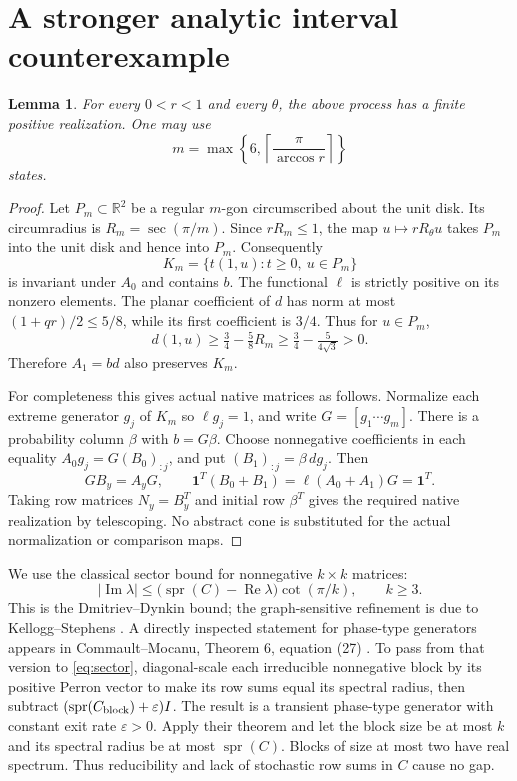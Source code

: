 \documentclass[11pt]{article}
\newtheorem{lemma}[theorem]{Lemma}
\newcommand{\R}{\mathbb R}
\newcommand{\one}{\mathbf 1}
\newcommand{\rhoo}{\operatorname{spr}}
\begin{document}
\section{A stronger analytic interval counterexample}
\begin{lemma}\label{lem:polygon}
For every $0<r<1$ and every $\theta$, the above process has a finite positive realization. One may use
\[
 m=\max\left\{6,\left\lceil\frac{\pi}{\arccos r}\right\rceil\right\}
\]
states.
\end{lemma}
\begin{proof}
Let $P_m\subset\R^2$ be a regular $m$-gon circumscribed about the unit disk. Its circumradius is $R_m=\sec(\pi/m)$. Since $rR_m\leq1$, the map $u\mapsto rR_\theta u$ takes $P_m$ into the unit disk and hence into $P_m$. Consequently
\[
 K_m=\{t(1,u):t\geq0,\ u\in P_m\}
\]
is invariant under $A_0$ and contains $b$. The functional $\ell$ is strictly positive on its nonzero elements. The planar coefficient of $d$ has norm at most $(1+qr)/2\leq5/8$, while its first coefficient is $3/4$. Thus for $u\in P_m$,
\[
 d(1,u)\geq\tfrac34-\tfrac58 R_m
 \geq\tfrac34-\tfrac5{4\sqrt3}>0.
\]
Therefore $A_1=bd$ also preserves $K_m$.

For completeness this gives actual native matrices as follows. Normalize each extreme generator $g_j$ of $K_m$ so $\ell g_j=1$, and write $G=[g_1\cdots g_m]$. There is a probability column $\beta$ with $b=G\beta$. Choose nonnegative coefficients in each equality $A_0g_j=G(B_0)_{:j}$, and put $(B_1)_{:j}=\beta\,dg_j$. Then
\[
 GB_y=A_yG,\qquad \one^T(B_0+B_1)=\ell(A_0+A_1)G=\one^T.
\]
Taking row matrices $N_y=B_y^T$ and initial row $\beta^T$ gives the required native realization by telescoping. No abstract cone is substituted for the actual normalization or comparison maps.
\end{proof}

We use the classical sector bound for nonnegative $k\times k$ matrices:
\begin{equation}\label{eq:sector}
 |\operatorname{Im}\lambda|\leq
 \bigl(\rhoo(C)-\operatorname{Re}\lambda\bigr)\cot(\pi/k),\qquad k\geq3.
\end{equation}
This is the Dmitriev--Dynkin bound; the graph-sensitive refinement is due to Kellogg--Stephens \cite{KS}. A directly inspected statement for phase-type generators appears in Commault--Mocanu, Theorem 6, equation (27) \cite{CM}. To pass from that version to \eqref{eq:sector}, diagonal-scale each irreducible nonnegative block by its positive Perron vector to make its row sums equal its spectral radius, then subtract $(\rhoo(C_{\rm block})+\varepsilon)I$. The result is a transient phase-type generator with constant exit rate $\varepsilon>0$. Apply their theorem and let the block size be at most $k$ and its spectral radius be at most $\rhoo(C)$. Blocks of size at most two have real spectrum. Thus reducibility and lack of stochastic row sums in $C$ cause no gap.
\end{document}
